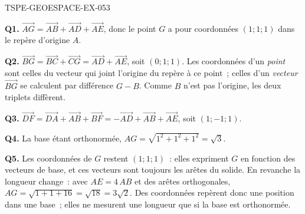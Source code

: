 \begin{corrige}{TSPE-GEOESPACE-EX-053}

\textbf{Q1.} $\vec{AG}=\vec{AB}+\vec{AD}+\vec{AE}$, donc le point $G$ a pour
coordonnées $(1;1;1)$ dans le repère d'origine $A$.

\textbf{Q2.} $\vec{BG}=\vec{BC}+\vec{CG}=\vec{AD}+\vec{AE}$, soit $(0;1;1)$.
Les coordonnées d'un \emph{point} sont celles du vecteur qui joint l'origine
du repère à ce point~; celles d'un \emph{vecteur} $\vec{BG}$ se calculent par
différence $G-B$. Comme $B$ n'est pas l'origine, les deux triplets diffèrent.

\textbf{Q3.} $\vec{DF}=\vec{DA}+\vec{AB}+\vec{BF}=-\vec{AD}+\vec{AB}+\vec{AE}$,
soit $(1;-1;1)$.

\textbf{Q4.} La base étant orthonormée,
$AG=\sqrt{1^2+1^2+1^2}=\sqrt{3}$.

\textbf{Q5.} Les coordonnées de $G$ restent $(1;1;1)$~: elles expriment $G$ en
fonction des vecteurs de base, et ces vecteurs sont toujours les arêtes du
solide. En revanche la longueur change~: avec $AE=4\,AB$ et des arêtes
orthogonales, $AG=\sqrt{1+1+16}=\sqrt{18}=3\sqrt{2}$. Des coordonnées repèrent
donc une position dans une base~; elles ne mesurent une longueur que si la
base est orthonormée.

\end{corrige}

%
%
%
%
%
